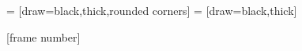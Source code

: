  = [draw=black,thick,rounded corners]
 = [draw=black,thick]

[frame number]{}

\def\SAT{\textcolor{green}{\texttt{SAT}}}
\def\UNSAT{\textcolor{red}{\texttt{UNSAT}}}

\def\true{\textcolor{green}{\texttt{T}}}
\def\false{\textcolor{red}{\texttt{F}}}
\def\udef{\textcolor{black}{\texttt{U}}}

\def\ok{\textcolor{green}{\cmark}}
\def\ko{\textcolor{red}{\xmark}}




\newcommand{\cred}[1]{{\color{red}#1}}
\newcommand{\cgreen}[1]{{\color{hgreen}#1}}
\newcommand{\cblue}[1]{{\color{blue!80}#1}}
\newcommand{\cprop}[1]{{\color{orange}#1}}

\newcommand{\minisat}{\texttt{MiniSAT}}
\newcommand{\breakid}{\texttt{breakID}}
\newcommand{\shatter}{\texttt{Shatter}}
\newcommand{\cdclsym}{\texttt{MiniSym}}
\newcommand{\libdsb}{\textsf{cosy}}
\newcommand{\bliss}{\texttt{bliss}}
\newcommand{\saucy}{\texttt{saucy3}}
\newcommand{\unsat}{\textsc{unsat}\xspace}
\newcommand{\sat}{\textsc{sat}\xspace}
\newcommand{\ltv}{\ensuremath{<_{\scriptsize\mathcal{V}}}}


\newcommand\dunderline[3][-1pt]{{%
		\setbox0=\hbox{#3}
		\ooalign{\copy0\cr\rule[\dimexpr#1-#2\relax]{\wd0}{#2}}}}